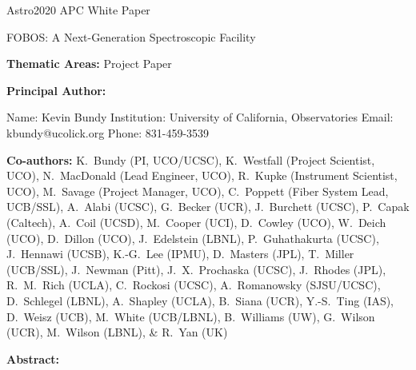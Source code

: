 \documentclass[oneside,12pt]{amsart}
\begin{document}
\raggedright
\huge
Astro2020 APC White Paper \linebreak

FOBOS: A Next-Generation Spectroscopic Facility \linebreak
\normalsize

\noindent \textbf{Thematic Areas:} Project Paper
  
\textbf{Principal Author:}

Name:	Kevin Bundy
 \linebreak						
Institution:  University of California, Observatories
 \linebreak
Email:  kbundy@ucolick.org
 \linebreak
Phone:  831-459-3539
 \linebreak
 
\textbf{Co-authors:} {\footnotesize K.~Bundy (PI, UCO/UCSC), K.~Westfall (Project
Scientist, UCO), N.~MacDonald (Lead Engineer, UCO), R.~Kupke
(Instrument Scientist, UCO), M.~Savage (Project Manager, UCO),
C.~Poppett (Fiber System Lead, UCB/SSL), A.~Alabi (UCSC), G.~Becker
(UCR), J.~Burchett (UCSC), P.~Capak (Caltech), A.~Coil (UCSD),
M.~Cooper (UCI), D.~Cowley (UCO), W.~Deich (UCO), D.~Dillon (UCO),
J.~Edelstein (LBNL), P.~Guhathakurta (UCSC), J.~Hennawi (UCSB),
K.-G.~Lee (IPMU), D.~Masters (JPL), T.~Miller (UCB/SSL), J.~Newman
(Pitt), J.~X.~Prochaska (UCSC), J.~Rhodes (JPL), R.~M.~Rich (UCLA),
C.~Rockosi (UCSC), A.~Romanowsky (SJSU/UCSC), D.~Schlegel (LBNL),
A.~Shapley (UCLA), B.~Siana (UCR), Y.-S.~Ting (IAS), D.~Weisz
(UCB), M.~White (UCB/LBNL), B.~Williams (UW), G.~Wilson (UCR),
M.~Wilson (LBNL), \& R.~Yan (UK)}
  \linebreak

\textbf{Abstract:} 
\end{document}
